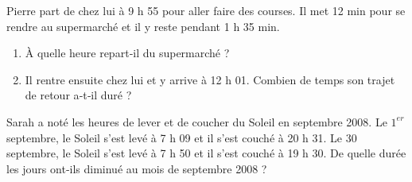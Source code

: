 \begin{exercice}
Pierre part de chez lui à 9 h 55 pour aller faire des courses. Il met 12 min pour se rendre au supermarché et il y reste pendant 1 h 35 min.
\begin{enumerate} 
 \item À quelle heure repart‑il du supermarché ?
 \item Il rentre ensuite chez lui et y arrive à 12 h 01. Combien de temps son trajet de retour a‑t‑il duré ?
 \end{enumerate}
\end{exercice}


\begin{exercice}
Sarah a noté les heures de lever et de coucher du Soleil en septembre 2008. Le $1^{er}$ septembre, le Soleil s'est levé à 7 h 09 et il s'est couché à 20 h 31. Le 30 septembre, le Soleil s'est levé à 7 h 50 et il s'est couché à 19 h 30. De quelle durée les jours ont‑ils diminué au mois de septembre 2008 ?
\end{exercice}
 
